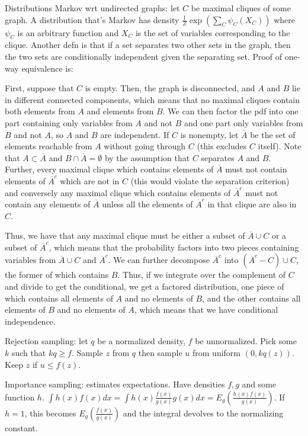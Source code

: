\documentclass{article}
\newcommand{\conj}{\overline}
\begin{document}
Distributions Markov wrt undirected graphs: let $C$ be maximal cliques of some graph. A distribution that's Markov has density $\frac{1}{Z}\exp\left(\sum_C\psi_C(X_C)\right)$ where $\psi_C$ is an arbitrary function and $X_C$ is the set of variables corresponding to the clique. Another defn is that if a set separates two other sets in the graph, then the two sets are conditionally independent given the separating set. Proof of one-way equivalence is:

First, suppose that $C$ is empty. Then, the graph is disconnected, and $A$ and $B$ lie in different connected components, which means that no maximal cliques contain both elements from $A$ and elements from $B$. We can then factor the pdf into one part containing only variables from $A$ and not $B$ and one part only variables from $B$ and not $A$, so $A$ and $B$ are independent. If $C$ is nonempty, let $\conj{A}$ be the set of elements reachable from $A$ without going through $C$ (this excludes $C$ itself). Note that $A\subset \conj{A}$ and $B\cap\conj{A}=\emptyset$ by the assumption that $C$ separates $A$ and $B$. Further, every maximal clique which contains elements of $\conj{A}$ must not contain elements of $\conj{A}^c$ which are not in $C$ (this would violate the separation criterion) and conversely any maximal clique which contains elements of $\conj{A}^c$ must not contain any elements of $\conj{A}$ unless all the elements of $\conj{A}^c$ in that clique are also in $C$. 

Thus, we have that any maximal clique must be either a subset of $\conj{A}\cup C$ or a subset of $\conj{A}^c$, which means that the probability factors into two pieces containing variables from $\conj{A}\cup C$ and $\conj{A}^c$. We can further decompose $\conj{A}^c$ into $(\conj{A}^c-C)\cup C$, the former of which contains $B$. Thus, if we integrate over the complement of $C$ and divide to get the conditional, we get a factored distribution, one piece of which contains all elements of $A$ and no elements of $B$, and the other contains all elements of $B$ and no elements of $A$, which means that we have conditional independence.
    
Rejection sampling: let $q$ be a normalized density, $f$ be unnormalized. Pick some $k$ such that $kq\geq f$. Sample $z$ from $q$ then sample $u$ from uniform $(0,kq(z))$. Keep $z$ if $u\leq f(z)$.

Importance sampling: estimates expectations. Have densities $f,g$ and some function $h$. $\int h(x)f(x)dx=\int h(x)\frac{f(x)}{g(x)}g(x)dx=E_g\left(\frac{h(x)f(x)}{g(x)}\right)$. If $h=1$, this becomes $E_g\left(\frac{f(x)}{g(x)}\right)$ and the integral devolves to the normalizing constant. 
\end{document}
